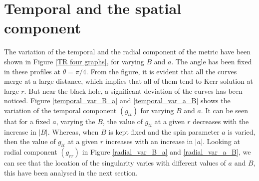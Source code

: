 \documentclass[12pt,a4paper,oneside]{book}
\begin{document}
\section{Temporal and the spatial component} \label{Sec_Temp_Rad_Rot_Sol}
The variation of the temporal and the radial component of the metric have been shown in Figure \ref{TR four graphs}, for varying $B$ and $a$. The angle has been fixed in these profiles at $\theta = \pi/4$. From the figure, it is evident that all the curves merge at a large distance, which implies that all of them tend to Kerr solution at large $r$. But near the black hole, a significant deviation of the curves has been noticed. Figure \ref{temporal_var_B_a} and \ref{temporal_var_a_B} shows the variation of the temporal component $(g_{tt})$ for varying $B$ and $a$. It can be seen that for a fixed $a$, varying the $B$, the value of $g_{tt}$ at a given $r$ decreases with the increase in $|B|$. Whereas, when $B$ is kept fixed and the spin parameter $a$ is varied, then the value of $g_{tt}$ at a given $r$ increases with an increase in $|a|$. Looking at radial component $(g_{rr})$ in  Figure \ref{radial_var_B_a} and \ref{radial_var_a_B}, we can see that the location of the singularity varies with different values of $a$ and $B$, this have been analysed in the next section.
\end{document}

